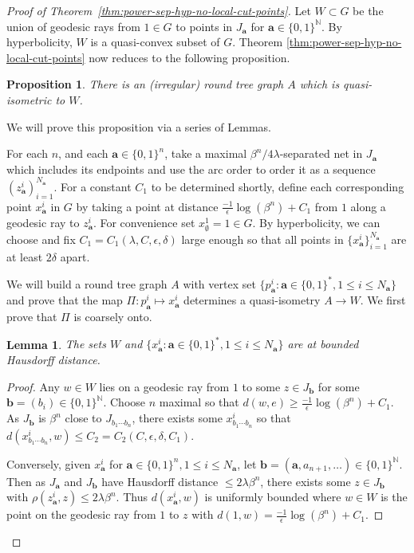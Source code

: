\documentclass[11pt]{amsart}
\numberwithin{equation}{section}
\newtheorem{proposition}[equation]{Proposition}
\newtheorem{lemma}[equation]{Lemma}
\theoremstyle{citing}
\newcommand{\N}{\mathbb{N}}
\newcommand{\ba}{\mathbf{a}}
\newcommand{\bbb}{\mathbf{b}}
\numberwithin{equation}{section}
\begin{document}
\begin{proof}[Proof of Theorem~\ref{thm:power-sep-hyp-no-local-cut-points}]
    Let $W \subset G$ be the union of geodesic rays from $1 \in G$ to points in $J_\ba$ for $\ba \in \{0,1\}^\N$. By hyperbolicity, $W$ is a quasi-convex subset of $G$. Theorem \ref{thm:power-sep-hyp-no-local-cut-points} now reduces to the following proposition.
	\begin{proposition}\label{prop:QI-round-tree-graph} There is an (irregular) round tree graph $A$ which is quasi-isometric to $W$.
    \end{proposition}

    We will prove this proposition via a series of Lemmas.
    
	For each $n$, and each $\ba \in \{0,1\}^n$, take a maximal $\beta^n / 4\lambda$-separated net in $J_{\ba}$ which includes its endpoints and use the arc order to order it as a sequence $(z_{\ba}^{i})_{i=1}^{N_\ba}$.
	For a constant $C_1$ to be determined shortly, define each corresponding point $x_{\ba}^i$ in $G$ by taking a point at distance $\frac{-1}{\epsilon}\log(\beta^n)+C_1$ from $1$ along a geodesic ray to $z_{\ba}^i$.  For convenience set $x_\emptyset^1 = 1 \in G$.  
	By hyperbolicity, we can choose and fix $C_1=C_1(\lambda,C,\epsilon,\delta)$ large enough so that all points in $\{x_{\ba}^i\}_{i=1}^{N_\ba}$ are at least $2\delta$ apart.

	  We will build a round tree graph $A$ with vertex set $\{p_\ba^i: \ba \in \{0,1\}^*, 1 \leq i \leq N_{\ba}\}$ and prove that the map $\Pi:p_\ba^i\mapsto x_\ba^i$ determines a quasi-isometry $A \to W$. We first prove that $\Pi$ is coarsely onto.
	

	\begin{lemma}\label{lem:cantorarcs0}
		The sets $W$ and $\{x_\ba^i: \ba \in \{0,1\}^*, 1 \leq i \leq N_{\ba}\}$ are at bounded Hausdorff distance.
	\end{lemma}
	\begin{proof}
		Any $w \in W$ lies on a geodesic ray from $1$ to some $z \in J_\bbb$ for some $\bbb = (b_i) \in \{0,1\}^\N$.  
	Choose $n$ maximal so that $d(w,e) \geq \frac{-1}{\epsilon}\log(\beta^n)+C_1$.
	As $J_{\bbb}$ is $\beta^{n}$ close to $J_{b_1\cdots b_n}$, there exists some $x_{b_1\cdots b_n}^i$ so that $d(x_{b_1\cdots b_n}^i, w) \leq C_2=C_2(C,\epsilon,\delta,C_1)$.
		
		Conversely, given $x_\ba^i$ for $\ba \in \{0,1\}^n, 1 \leq i \leq N_\ba$, let $\bbb=(\ba,a_{n+1},\ldots) \in \{0,1\}^\N$.  Then as $J_\ba$ and $J_{\bbb}$ have Hausdorff distance $\leq 2\lambda\beta^n$, there exists some $z \in J_{\bbb}$ with $\rho(z_\ba^i, z) \leq 2\lambda\beta^n$.  Thus $d(x_\ba^i,w)$ is uniformly bounded where $w\in W$ is the point on the geodesic ray from $1$ to $z$ with $d(1,w)=\frac{-1}{\epsilon}\log(\beta^n)+C_1$.
	\end{proof}


\end{proof}
\end{document}
